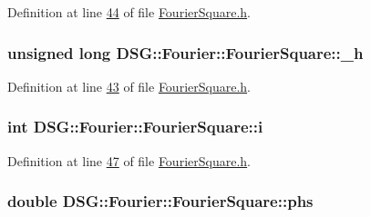 Definition at line \hyperlink{_fourier_square_8h_source_l00044}{44} of file \hyperlink{_fourier_square_8h_source}{Fourier\+Square.\+h}.

\hypertarget{class_d_s_g_1_1_fourier_1_1_fourier_square_ac482ccc644bac01f3491503a755b453c}{
\subsubsection[{\+\_\+h}]{\setlength{\rightskip}{0pt plus 5cm}unsigned long D\+S\+G\+::\+Fourier\+::\+Fourier\+Square\+::\+\_\+h\hspace{0.3cm}{\ttfamily [protected]}}}\label{class_d_s_g_1_1_fourier_1_1_fourier_square_ac482ccc644bac01f3491503a755b453c}


Definition at line \hyperlink{_fourier_square_8h_source_l00043}{43} of file \hyperlink{_fourier_square_8h_source}{Fourier\+Square.\+h}.

\hypertarget{class_d_s_g_1_1_fourier_1_1_fourier_square_ad52c23216a09d1933e5b3289f2d54db2}{
\subsubsection[{i}]{\setlength{\rightskip}{0pt plus 5cm}int D\+S\+G\+::\+Fourier\+::\+Fourier\+Square\+::i\hspace{0.3cm}{\ttfamily [protected]}}}\label{class_d_s_g_1_1_fourier_1_1_fourier_square_ad52c23216a09d1933e5b3289f2d54db2}


Definition at line \hyperlink{_fourier_square_8h_source_l00047}{47} of file \hyperlink{_fourier_square_8h_source}{Fourier\+Square.\+h}.

\hypertarget{class_d_s_g_1_1_fourier_1_1_fourier_square_a6e20ab344501c18d79d594ec83f34164}{
\subsubsection[{phs}]{\setlength{\rightskip}{0pt plus 5cm}double D\+S\+G\+::\+Fourier\+::\+Fourier\+Square\+::phs\hspace{0.3cm}{\ttfamily [protected]}}}\label{class_d_s_g_1_1_fourier_1_1_fourier_square_a6e20ab344501c18d79d594ec83f34164}


